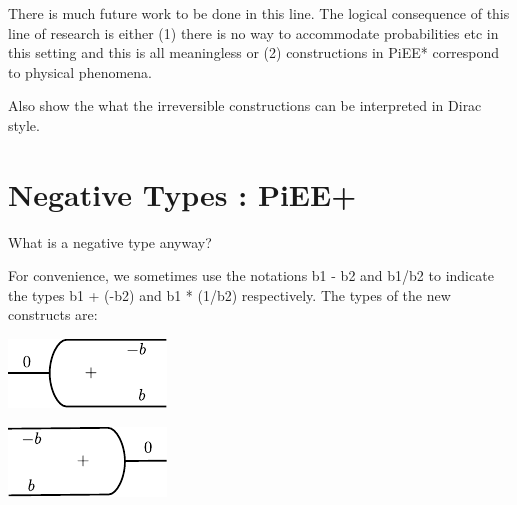 \documentclass[preprint]{sigplanconf}
\begin{document}

There is much future work to be done in this line. The logical
consequence of this line of research is either (1) there is no way to
accommodate probabilities etc in this setting and this is all
meaningless or (2) constructions in {{PiEE*}} correspond to physical
phenomena.

Also show the what the irreversible constructions can be interpreted
in Dirac style.

\section{Negative Types : {{PiEE+}} }

What is a negative type anyway? 

%

For convenience, we sometimes use the notations {{b1 - b2}} and
{{b1/b2}} to indicate the types {{b1 + (-b2)}} and {{b1 * (1/b2)}}
respectively.  The types of the new constructs are:
\vspace{-15pt}
\begin{multicols}{2}  

\end{multicols}


\begin{multicols}{2}
\begin{center}
  \includegraphics{diagrams/eta.pdf}
\end{center}
  
\begin{center}
 \includegraphics{diagrams/eps.pdf}
\end{center}
\end{multicols}
\end{document}
